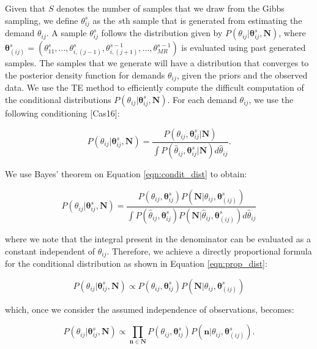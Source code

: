 \documentclass[a4paper,11pt,titlepage]{article}
\begin{document}
Given that $S$ denotes the number of samples that we draw from the Gibbs sampling, we define $\theta_{ij}^{s}$ as the $s$th sample that is generated from estimating the demand $\theta_{ij}$. A sample $\theta_{ij}^{s}$ follows the distribution given by $P(\theta_{ij}|\bm{\theta}_{ij}^{s}, \mathbf{N})$, where $\bm{\theta}_{(ij)}^{s} = (\theta_{11}^{s}, ..., \theta_{i,(j-1)}^{s},\theta_{i,(j+1)}^{s-1},...,\theta_{MR}^{s-1})$ is evaluated using past generated samples. The samples that we generate will have a distribution that converges to the posterior density function for demands $\theta_{ij}$, given the priors and the observed data. We use the TE method to efficiently compute the difficult computation of the conditional distributions $P(\theta_{ij}|\bm{\theta}_{ij}^s, \mathbf{N})$. For each demand $\theta_{ij}$, we use the following conditioning [Cas16]: 

\begin{equation}
    P(\theta_{ij}|\bm{\theta}_{ij}^s, \mathbf{N}) = 
   \frac{ P(\theta_{ij},\bm{\theta}_{ij}^{s}|\mathbf{N})}{\int P(\hat{\theta}_{ij}, \bm{\theta}_{ij}^s|\mathbf{N})d \hat{\theta}_{ij}}.
   \label{eqn:condit_dist}
\end{equation}

We use Bayes' theorem on Equation \ref{eqn:condit_dist} to obtain: 

\begin{equation}
    P(\theta_{ij}|\bm{\theta}_{ij}^s, \mathbf{N}) = 
     \frac{ P(\theta_{ij},\bm{\theta}_{ij}^{s}) P(\mathbf{N}| \theta_{ij}, \bm{\theta}_{(ij)}^{s})}{\int P(\hat{\theta}_{ij},\bm{\theta}_{ij}^{s}) P(\mathbf{N}| \hat{\theta}_{ij}, \bm{\theta}_{(ij)}^{s})d \hat{\theta}_{ij}}
     \label{eqn:condit_dist_bayes}
\end{equation}

where we note that the integral present in the denominator can be evaluated as a constant independent of $\theta_{ij}$. Therefore, we achieve a directly proportional formula for the conditional distribution as shown in Equation \ref{eqn:prop_dist}:

\begin{equation}
    P(\theta_{ij}|\bm{\theta}_{ij}^s, \mathbf{N}) \propto P(\theta_{ij},\bm{\theta}_{ij}^{s}) P(\mathbf{N}| \theta_{ij}, \bm{\theta}_{(ij)}^{s})
    \label{eqn:prop_dist}
\end{equation}

which, once we consider the assumed independence of observations, becomes:

\begin{equation}
    P(\theta_{ij}|\bm{\theta}_{ij}^s, \mathbf{N}) \propto \prod_{\mathbf{n} \in \mathbf{N}} P(\theta_{ij},\bm{\theta}_{ij}^{s}) P(\mathbf{n}| \theta_{ij}, \bm{\theta}_{(ij)}^{s}).
\end{equation}
\end{document}
